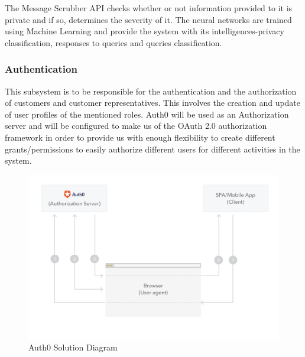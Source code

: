 \documentclass[11pt]{article}
\begin{document}
The Message Scrubber API checks whether or not information provided to it is private and if so, determines the severity of it. The neural networks are trained using Machine Learning and provide the system with its intelligences-privacy classification, responses to queries and queries classification.

\subsubsection{Authentication}

This subsystem is to be responsible for the authentication and the authorization of customers and customer representatives. This involves the creation and update of user profiles of the mentioned roles. Auth0 will be used as an Authorization server and will be configured to make us of the OAuth 2.0 authorization framework in order to provide us with enough flexibility to create different grants/permissions to easily authorize different users for different activities in the system.

\begin{figure}[H]
	\centering
	\includegraphics[width=1.0\textwidth]{../../images/implicit-grant.png}
	\caption{Auth0 Solution Diagram\cite{Website:1}}
\end{figure}
\end{document}
